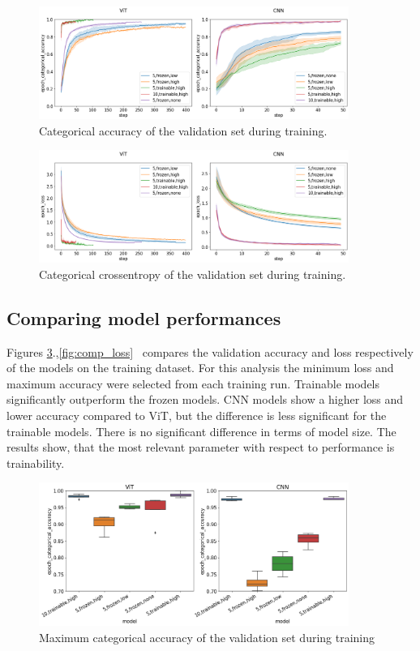 \documentclass{article}
\begin{document}
\begin{figure}[h]
\includegraphics[width=0.9\textwidth]{accuracy_validation.png}
\caption{Categorical accuracy of the validation set during training.\label{fig:curves_acc}}
\end{figure}

\begin{figure}[h]
\includegraphics[width=0.9\textwidth]{loss_validation.png}
\caption{Categorical crossentropy of the validation set during training.\label{fig:curves_loss}}
\end{figure}

\subsection{Comparing model performances}
Figures \ref{fig:comp_acc}.,\ref{fig:comp_loss}~ compares the validation accuracy and loss respectively of the models on the training dataset. For this analysis the minimum loss and maximum accuracy were selected from each training run. Trainable models significantly outperform the frozen models. CNN models show a higher loss and lower accuracy compared to ViT, but the difference is less significant for the trainable models. There is no significant difference in terms of model size. The results show, that the most relevant parameter with respect to performance is trainability.

\begin{figure}[h]
\includegraphics[width=0.9\textwidth]{accuracy_comp_validation.png}
\caption{Maximum categorical accuracy of the validation set during training\label{fig:comp_acc}}
\end{figure}
\end{document}
